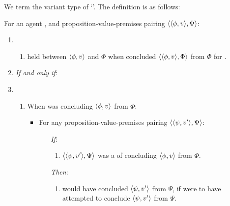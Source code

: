 \begin{note}
  We term the variant type of \support{} `\zSX{}'.
  The definition is as follows:
  \begin{definition}[\zSX{}]
    \label{idea:zSX}
    For an agent \vAgent{}, and proposition-value-premises pairing \(\langle \langle \phi, v \rangle, \Phi \rangle\):
    \begin{enumerate}[label=]
    \item
      \begin{enumerate}[label=]
      \item
        \zSX{} held between \(\langle \phi, v \rangle\) and \(\Phi\) when \vAgent{} concluded \(\langle \langle \phi, v \rangle, \Phi \rangle\) from \(\Phi\) for \vAgent{}.
      \end{enumerate}
    \item \emph{If and only if}:
    \item
      \begin{enumerate}[label=]
      \item
        When \vAgent{} was concluding \(\langle \phi, v \rangle\) from \(\Phi\):
        \begin{itemize}
        \item
          For any proposition-value-premises pairing \(\langle \langle \psi, v' \rangle, \Psi \rangle\):
          \begin{enumerate}[label=]
          \item[\emph{If}:]
            \begin{enumerate}[label=\alph*., ref=(\alph*)]
            \item
              \label{question:zs:option}
              \(\langle \langle \psi, v' \rangle, \Psi \rangle\) was a \requ{} of concluding \(\langle \phi, v \rangle\) from \(\Phi\).
            \end{enumerate}
          \item[\emph{Then}:]
            \begin{enumerate}[label=\alph*., ref=(\alph*), resume]
            \item
              \label{question:zs:may-fail}
              \vAgent{} would have concluded \(\langle \psi, v' \rangle\) from \(\Psi\), if \vAgent{} were to have attempted to conclude \(\langle \psi, v' \rangle\) from \(\Psi\).
            \end{enumerate}
          \end{enumerate}
        \end{itemize}
      \end{enumerate}
    \end{enumerate}
    \vspace{-\baselineskip}
  \end{definition}
\end{note}

